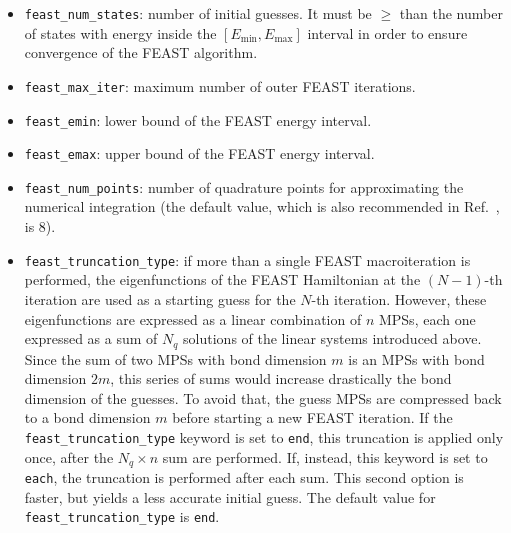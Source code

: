 \documentclass[bibliography=totoc,12pt,a4paper]{scrartcl}
\begin{document}
\begin{itemize}
  \item \texttt{feast\_num\_states}: number of initial guesses.
  It must be $\geq$ than the number of states with energy inside the $\left[ E_\text{min}, E_\text{max} \right]$ interval in order to ensure convergence of the FEAST algorithm.
  \item \texttt{feast\_max\_iter}: maximum number of outer FEAST iterations.
  \item \texttt{feast\_emin}: lower bound of the FEAST energy interval.
  \item \texttt{feast\_emax}: upper bound of the FEAST energy interval.
  \item \texttt{feast\_num\_points}: number of quadrature points for approximating the numerical integration (the default value, which is also recommended in Ref.~, is 8).
  \item \texttt{feast\_truncation\_type}: if more than a single FEAST macroiteration is performed, the eigenfunctions of the FEAST Hamiltonian at the $(N-1)$-th iteration are used as a starting guess for the $N$-th iteration.
  However, these eigenfunctions are expressed as a linear combination of $n$ MPSs, each one expressed as a sum of $N_q$ solutions of the linear systems introduced above.
  Since the sum of two MPSs with bond dimension $m$ is an MPSs with bond dimension $2m$, this series of sums would increase drastically the bond dimension of the guesses.
  To avoid that, the guess MPSs are compressed back to a bond dimension $m$ before starting a new FEAST iteration.
  If the \texttt{feast\_truncation\_type} keyword is set to \texttt{end}, this truncation is applied only once, after the $N_q \times n$ sum are performed.
  If, instead, this keyword is set to \texttt{each}, the truncation is performed after each sum.
  This second option is faster, but yields a less accurate initial guess.
  The default value for \texttt{feast\_truncation\_type} is \texttt{end}.

\end{itemize}
\end{document}
